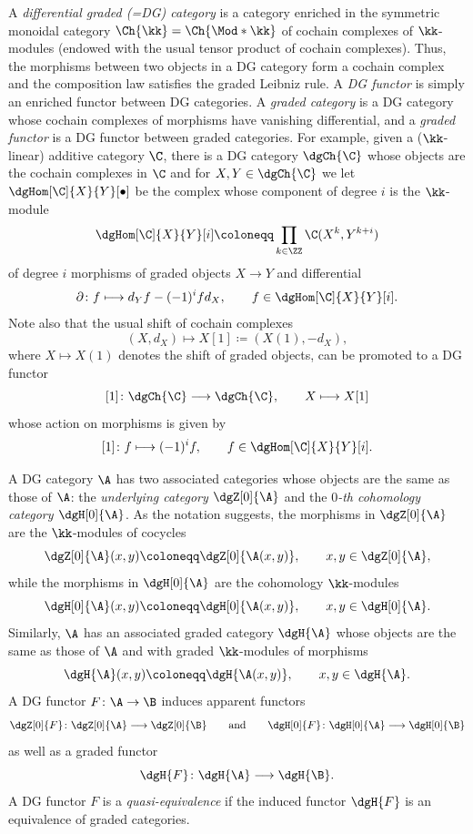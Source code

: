 \documentclass[a4paper]{amsart}
\begin{document}
A \emph{differential graded (=DG) category} is a category enriched in the
symmetric monoidal category $\Ch{\kk}=\Ch{\Mod*{\kk}}$ of cochain complexes of
$\kk$-modules (endowed with the usual tensor product of cochain complexes).
Thus, the morphisms between two objects in a DG category form a cochain complex
and the composition law satisfies the graded Leibniz rule. A \emph{DG functor}
is simply an enriched functor between DG categories. A \emph{graded category} is
a DG category whose cochain complexes of morphisms have vanishing differential,
and a \emph{graded functor} is a DG functor between graded categories. For
example, given a ($\kk$-linear) additive category $\C$, there is a DG category
$\dgCh{\C}$ whose objects are the cochain complexes in $\C$ and for
$X,Y\in\dgCh{\C}$ we let $ \dgHom[\C]{X}{Y}[\bullet]$ be the complex whose
component of degree $i$ is the $\kk$-module
\[
  \dgHom[\C]{X}{Y}[i]\coloneqq\prod_{k\in\ZZ}\C(X^k,Y^{k+i})
\]
of degree $i$ morphisms of graded objects $X\to Y$ and differential
\[
  \partial\colon f\longmapsto d_Yf-(-1)^ifd_X,\qquad f\in\dgHom[\C]{X}{Y}[i]. \]
Note also that the usual shift of cochain complexes
\[
  (X,d_X)\longmapsto X[1]\coloneqq(X(1),-d_X),
\]
where $X\mapsto X(1)$ denotes the shift of graded objects, can be promoted to a
DG functor
\[
  [1]\colon\dgCh{\C}\longrightarrow\dgCh{\C},\qquad X\longmapsto X[1]
\]
whose action on morphisms is given by
\[
  [1]\colon f\longmapsto (-1)^if,\qquad f\in\dgHom[\C]{X}{Y}[i].
\]

A DG category $\A$ has two associated categories whose objects are the same as
those of $\A$: the \emph{underlying category $\dgZ[0]{\A}$} and the \emph{$0$-th
  cohomology category $\dgH[0]{\A}$}. As the notation suggests, the morphisms in
$\dgZ[0]{\A}$ are the $\kk$-modules of cocycles
\[
  \dgZ[0]{\A}(x,y)\coloneqq\dgZ[0]{\A(x,y)},\qquad x,y\in\dgZ[0]{\A},
\]
while the morphisms in $\dgH[0]{\A}$ are the cohomology $\kk$-modules
\[
  \dgH[0]{\A}(x,y)\coloneqq\dgH[0]{\A(x,y)},\qquad x,y\in\dgH[0]{\A}.
\]
Similarly, $\A$ has an associated graded category $\dgH{\A}$ whose objects are
the same as those of $\A$ and with graded $\kk$-modules of morphisms
\[
  \dgH{\A}(x,y)\coloneqq\dgH{\A(x,y)},\qquad x,y\in\dgH{\A}.
\]
A DG functor $F\colon\A\to\B$ induces apparent functors
\[
  \dgZ[0]{F}\colon\dgZ[0]{\A}\longrightarrow\dgZ[0]{\B}\qquad\text{and}\qquad\dgH[0]{F}\colon\dgH[0]{\A}\longrightarrow\dgH[0]{\B}
\]
as well as a graded functor
\[
  \dgH{F}\colon\dgH{\A}\longrightarrow\dgH{\B}.
\]
A DG functor $F$ is a \emph{quasi-equivalence} if the induced functor $\dgH{F}$
is an equivalence of graded categories.
\end{document}

